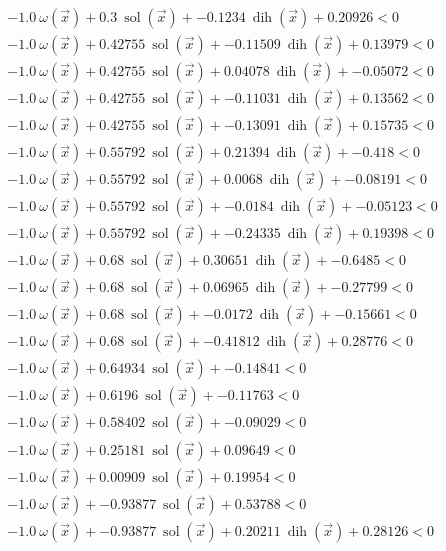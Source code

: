 \documentclass{article} %
\DeclareMathOperator{\sol}{sol}
\DeclareMathOperator{\dih}{dih}
\newcommand{\vx}{\vec{x}}
\begin{document}
\begin{align*}
&-1.0\ \omega(\vx) + 0.3\ \sol(\vx) + -0.1234\ \dih(\vx) + 0.20926 < 0 \tag{D\_836501282} \\
&-1.0\ \omega(\vx) + 0.42755\ \sol(\vx) + -0.11509\ \dih(\vx) + 0.13979 < 0 \tag{D\_815857122} \\
&-1.0\ \omega(\vx) + 0.42755\ \sol(\vx) + 0.04078\ \dih(\vx) + -0.05072 < 0 \tag{D\_143442051} \\
&-1.0\ \omega(\vx) + 0.42755\ \sol(\vx) + -0.11031\ \dih(\vx) + 0.13562 < 0 \tag{D\_616037833} \\
&-1.0\ \omega(\vx) + 0.42755\ \sol(\vx) + -0.13091\ \dih(\vx) + 0.15735 < 0 \tag{D\_943639543} \\
&-1.0\ \omega(\vx) + 0.55792\ \sol(\vx) + 0.21394\ \dih(\vx) + -0.418 < 0 \tag{D\_348573741} \\
&-1.0\ \omega(\vx) + 0.55792\ \sol(\vx) + 0.0068\ \dih(\vx) + -0.08191 < 0 \tag{D\_887895540} \\
&-1.0\ \omega(\vx) + 0.55792\ \sol(\vx) + -0.0184\ \dih(\vx) + -0.05123 < 0 \tag{D\_292050936} \\
&-1.0\ \omega(\vx) + 0.55792\ \sol(\vx) + -0.24335\ \dih(\vx) + 0.19398 < 0 \tag{D\_747114280} \\
&-1.0\ \omega(\vx) + 0.68\ \sol(\vx) + 0.30651\ \dih(\vx) + -0.6485 < 0 \tag{D\_407035272} \\
&-1.0\ \omega(\vx) + 0.68\ \sol(\vx) + 0.06965\ \dih(\vx) + -0.27799 < 0 \tag{D\_746762527} \\
&-1.0\ \omega(\vx) + 0.68\ \sol(\vx) + -0.0172\ \dih(\vx) + -0.15661 < 0 \tag{D\_908135697} \\
&-1.0\ \omega(\vx) + 0.68\ \sol(\vx) + -0.41812\ \dih(\vx) + 0.28776 < 0 \tag{D\_852700722} \\
&-1.0\ \omega(\vx) + 0.64934\ \sol(\vx) + -0.14841 < 0 \tag{D\_187794654} \\
&-1.0\ \omega(\vx) + 0.6196\ \sol(\vx) + -0.11763 < 0 \tag{D\_241250402} \\
&-1.0\ \omega(\vx) + 0.58402\ \sol(\vx) + -0.09029 < 0 \tag{D\_614375500} \\
&-1.0\ \omega(\vx) + 0.25181\ \sol(\vx) + 0.09649 < 0 \tag{D\_392850749} \\
&-1.0\ \omega(\vx) + 0.00909\ \sol(\vx) + 0.19954 < 0 \tag{D\_324682944} \\
&-1.0\ \omega(\vx) + -0.93877\ \sol(\vx) + 0.53788 < 0 \tag{D\_102919537} \\
&-1.0\ \omega(\vx) + -0.93877\ \sol(\vx) + 0.20211\ \dih(\vx) + 0.28126 < 0 \tag{D\_756454529} \\

\end{align*}
\end{document}
